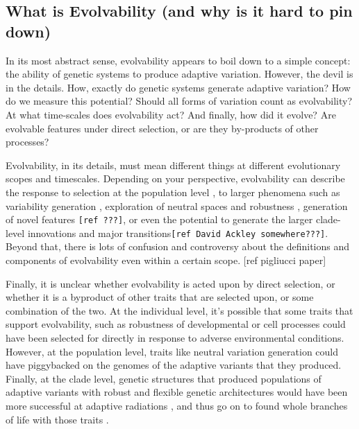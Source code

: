 \subsection{What is Evolvability (and why is it hard to pin down)}

In its most abstract sense, evolvability appears to boil down to a simple concept: the ability of genetic systems to produce adaptive variation. However, the devil is in the details.  How, exactly do genetic systems generate adaptive variation? How do we measure this potential? Should all forms of variation count as evolvability? At what time-scales does evolvability act?  And finally, how did it evolve? Are evolvable features under direct selection, or are they by-products of other processes?

Evolvability, in its details, must mean different things at different evolutionary scopes and timescales. Depending on your perspective, evolvability can describe the response to selection at the population level \cite{Fisher_1930}\cite{houle_comparing_1992}, to larger phenomena such as variability generation  \cite{gunter_p._wagner_perspective:_1996}, exploration of neutral spaces and robustness \cite{andreas_wagner_robustness_2005} \cite{kitano_biological_2004}, generation of novel features \verb|[ref ???]|, or even the potential to generate the larger clade-level innovations \cite{kirschner_evolvability_1998} and major transitions\cite{smith_major_1995}\verb|[ref David Ackley somewhere???]|. Beyond that, there is lots of confusion and controversy about the definitions and components of evolvability even within a certain scope. \cite{pigliucci_is_2008}[ref pigliucci paper]

Finally, it is unclear whether evolvability is acted upon by direct selection, or whether it is a byproduct of other traits that are selected upon, or some combination of the two. At the individual level, it’s possible that some traits that support evolvability, such as robustness of developmental or cell processes \cite{kirschner_evolvability_1998} could have been selected for directly in response to adverse environmental conditions. However, at the population level, traits like neutral variation generation could have piggybacked on the genomes of the adaptive variants that they produced. Finally, at the clade level, genetic structures that produced populations of adaptive variants with robust and flexible genetic architectures would have been more successful at adaptive radiations \cite{dawkins_13_2003}, and thus go on to found whole branches of life with those traits \cite{kirschner_evolvability_1998}. 

